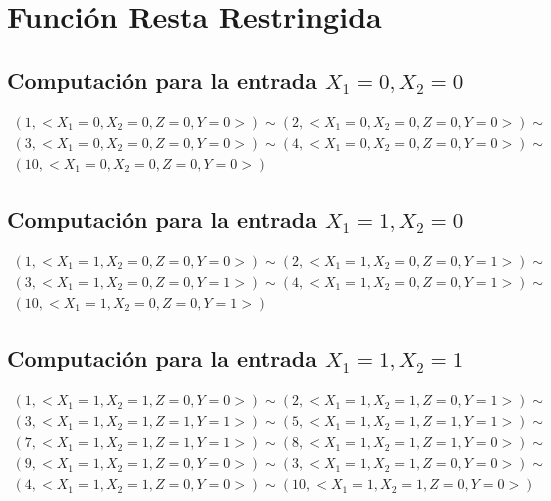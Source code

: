 \documentclass[a4paper]{article}
\begin{document}
		\section{Función Resta Restringida}
		\subsection{Computación para la entrada $X_1=0, X_2=0$}
		\begin{equation*}\begin{gathered}
		(1, <X_1=0, X_2=0, Z=0, Y=0>) \sim (2, <X_1=0, X_2=0, Z=0, Y=0>) \sim\\
		(3, <X_1=0, X_2=0, Z=0, Y=0>) \sim (4, <X_1=0, X_2=0, Z=0, Y=0>) \sim\\
		(10, <X_1=0, X_2=0, Z=0, Y=0>)
		\end{gathered}\end{equation*}
		\subsection{Computación para la entrada $X_1=1, X_2=0$}
		\begin{equation*}\begin{gathered}
		(1, <X_1=1, X_2=0, Z=0, Y=0>) \sim (2, <X_1=1, X_2=0, Z=0, Y=1>) \sim\\
		(3, <X_1=1, X_2=0, Z=0, Y=1>) \sim (4, <X_1=1, X_2=0, Z=0, Y=1>) \sim\\
		(10, <X_1=1, X_2=0, Z=0, Y=1>)
		\end{gathered}\end{equation*}
		\subsection{Computación para la entrada $X_1=1, X_2=1$}
		\begin{equation*}\begin{gathered}
		(1, <X_1=1, X_2=1, Z=0, Y=0>) \sim (2, <X_1=1, X_2=1, Z=0, Y=1>) \sim\\
		(3, <X_1=1, X_2=1, Z=1, Y=1>) \sim (5, <X_1=1, X_2=1, Z=1, Y=1>) \sim\\
		(7, <X_1=1, X_2=1, Z=1, Y=1>) \sim (8, <X_1=1, X_2=1, Z=1, Y=0>) \sim\\
		(9, <X_1=1, X_2=1, Z=0, Y=0>) \sim (3, <X_1=1, X_2=1, Z=0, Y=0>) \sim\\
		(4, <X_1=1, X_2=1, Z=0, Y=0>) \sim (10, <X_1=1, X_2=1, Z=0, Y=0>)
		\end{gathered}\end{equation*}
\end{document}
